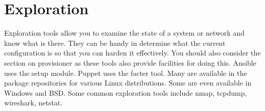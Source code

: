 \section{Exploration}

Exploration tools allow you to examine the state of a system or network and know what is there.
They can be handy in determine what the current configuration is so that you can harden it effectively.
You should also consider the section on provisioner as these tools also provide facilities for doing this.
Ansible uses the setup module.
Puppet uses the facter tool.
Many are available in the package repositories for various Linux distributions.
Some are even available in Windows and BSD.
Some common exploration tools include nmap, tcpdump, wireshark, netstat.

 
